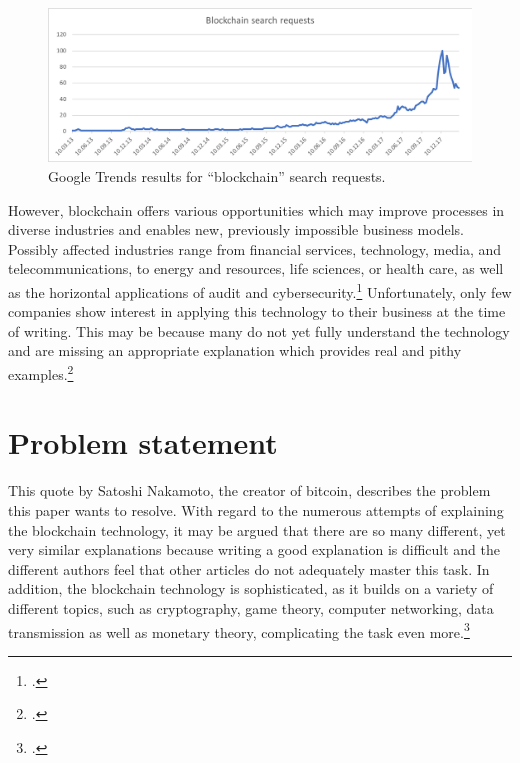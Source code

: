 \begin{figure}
    \centering
    \includegraphics[width=\textwidth]{latex-vorlage_v1.5/graphics/BCRQ.png}
    \caption[Google Trends results for \enquote{blockchain} search requests.]{Google Trends results for \enquote{blockchain} search requests.\protect\footnotemark}
    \label{fig:SearchRequests}
\end{figure}

However, blockchain offers various opportunities which may improve processes in diverse industries and enables new, previously impossible business models. Possibly affected industries range from financial services, technology, media, and telecommunications, to energy and resources, life sciences, or health care, as well as the horizontal applications of audit and cybersecurity.\footcite[Cf.][]{SchatskybitcoinBlockchaincoming2015} Unfortunately, only few companies show interest in applying this technology to their business at the time of writing. This may be because many do not yet fully understand the technology and are missing an appropriate explanation which provides real and pithy examples.\footcite[Cf.][P88]{BjoernPaulewicz_Interview}



\section{Problem statement} \label{sec:Problem}

This quote by Satoshi Nakamoto, the creator of bitcoin, describes the problem this paper wants to resolve. 
With regard to the numerous attempts of explaining the blockchain technology, it may be argued that there are so many different, yet very similar explanations because writing a good explanation is difficult and the different authors feel that other articles do not adequately master this task. In addition, the blockchain technology is sophisticated, as it builds on a variety of different topics, such as cryptography, game theory, computer networking, data transmission as well as monetary theory, complicating the task even more.\footcite[Cf.][]{LoppNobodyUnderstandsBitcoin2017} 


